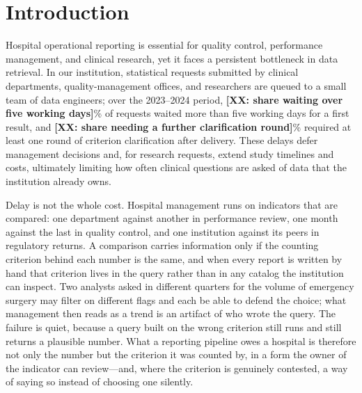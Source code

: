 \documentclass[applsci,article,submit,pdftex,oneauthor]{Definitions/mdpi}
\newcommand{\PH}[1]{{\color{red}\textbf{[#1]}}}
\begin{document}
\section{Introduction}
Hospital operational reporting is essential for quality control, performance
management, and clinical research, yet it faces a persistent bottleneck in data
retrieval. In our institution, statistical requests submitted by clinical
departments, quality-management offices, and researchers are queued to a small
team of data engineers; over the 2023--2024 period,
\PH{XX: share waiting over five working days}\% of requests waited more than five
working days for a first result, and \PH{XX: share needing a further clarification
round}\% required at least one round of criterion clarification after delivery. These delays defer
management decisions and, for research requests, extend study timelines and
costs, ultimately limiting how often clinical questions are asked of data that
the institution already owns.

Delay is not the whole cost. Hospital management runs on indicators that are
compared: one department against another in performance review, one month against
the last in quality control, and one institution against its peers in regulatory
returns. A comparison carries information only if the counting criterion behind
each number is the same, and when every report is written by hand that criterion
lives in the query rather than in any catalog the institution can inspect. Two
analysts asked in different quarters for the volume of emergency surgery may
filter on different flags and each be able to defend the choice; what management
then reads as a trend is an artifact of who wrote the query. The failure is quiet,
because a query built on the wrong criterion still runs and still returns a
plausible number. What a reporting pipeline owes a hospital is therefore not only
the number but the criterion it was counted by, in a form the owner of the
indicator can review---and, where the criterion is genuinely contested, a way of
saying so instead of choosing one silently.
\end{document}
